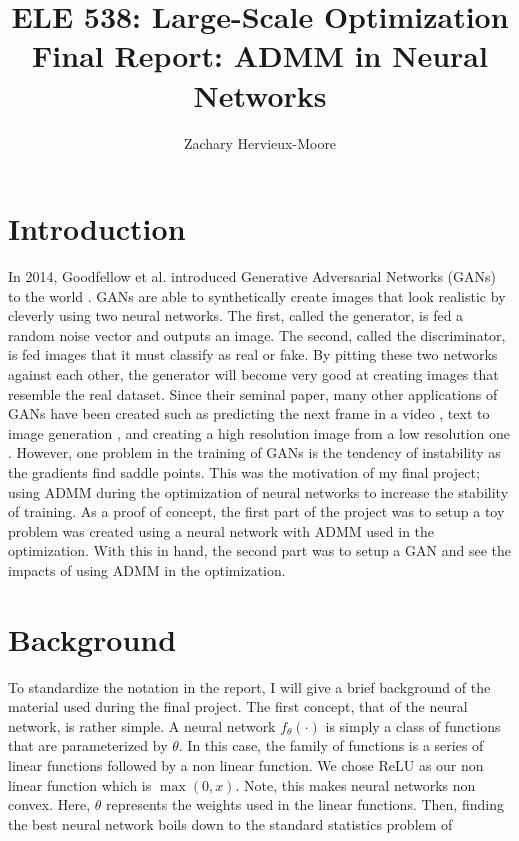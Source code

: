 \documentclass{article}
\title{ELE 538: Large-Scale Optimization \\ Final Report: ADMM in Neural Networks}
\author{Zachary Hervieux-Moore}
\date{\displaydate{date}}
\begin{document}
  \maketitle

  \clearpage

  \section{Introduction}

  In 2014, Goodfellow et al. introduced Generative Adversarial Networks (GANs) to the world \cite{goodfellow_2014}. GANs are able to synthetically create images that look realistic by cleverly using two neural networks. The first, called the generator, is fed a random noise vector and outputs an image. The second, called the discriminator, is fed images that it must classify as real or fake. By pitting these two networks against each other, the generator will become very good at creating images that resemble the real dataset. Since their seminal paper, many other applications of GANs have been created such as predicting the next frame in a video \cite{lotter_2015}, text to image generation \cite{reed_2016}, and creating a high resolution image from a low resolution one \cite{ledig_2016}. However, one problem in the training of GANs is the tendency of instability as the gradients find saddle points. This was the motivation of my final project; using ADMM during the optimization of neural networks to increase the stability of training. As a proof of concept, the first part of the project was to setup a toy problem was created using a neural network with ADMM used in the optimization. With this in hand, the second part was to setup a GAN and see the impacts of using ADMM in the optimization.

  \section{Background}

  To standardize the notation in the report, I will give a brief background of the material used during the final project. The first concept, that of the neural network, is rather simple. A neural network $f_\theta(\cdot)$ is simply a class of functions that are parameterized by $\theta$. In this case, the family of functions is a series of linear functions followed by a non linear function. We chose ReLU as our non linear function which is $\max(0,x)$. Note, this makes neural networks non convex. Here, $\theta$ represents the weights used in the linear functions. Then, finding the best neural network boils down to the standard statistics problem of
\end{document}

